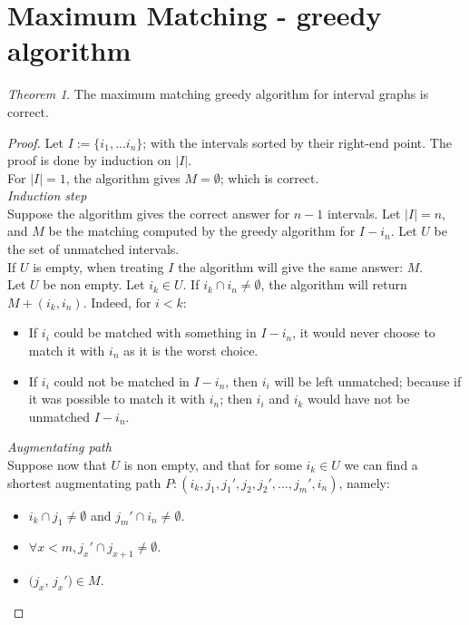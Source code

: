 \documentclass[12pt]{article}
\begin{document}
\theoremstyle{definition}
\newtheorem{definition}{Definition}[section]

\theoremstyle{remark}
\newtheorem*{remark}{Remark}
\newtheorem{theorem}{Theorem}[section]
\newtheorem{lemma}[theorem]{Lemma}

\section{Maximum Matching - greedy algorithm}

\begin{theorem}
    The maximum matching greedy algorithm for interval graphs is correct.
\end{theorem}

\begin{proof}
    Let $I:= \{i_1, ... i_n\}$; with the intervals sorted by their right-end point.
    The proof is done by induction on $|I|$.\\
    For $|I|=1$, the algorithm gives $M=\emptyset$; which is correct. \\

    \textit{Induction step}\\
    Suppose the algorithm gives the correct answer for $n-1$ intervals. Let $|I| = n$, and $M$ be the matching computed by the greedy algorithm for $I-i_n$. Let $U$ be the set of unmatched intervals. \\
    If $U$ is empty, when treating $I$ the algorithm will give the same answer: $M$.\\
    Let $U$ be non empty. Let $i_k \in U$. If $i_k \cap i_n \ne \emptyset$, the algorithm will return $M+(i_k, i_n)$. 
    Indeed, for $i<k$:
    \begin{itemize}
        \item If $i_i$ could be matched with something in $I-i_n$, it would never choose to match it with $i_n$ as it is the worst choice. 
        \item If $i_i$ could not be matched in $I-i_n$, then $i_i$ will be left unmatched; because if it was possible to match it with $i_n$; then $i_i$ and $i_k$ would have not be unmatched $I-i_n$. 
    \end{itemize} 

    \textit{Augmentating path}\\
    Suppose now that $U$ is non empty, and that for some $i_k \in U$ we can find a shortest augmentating path $P: (i_k, j_1, j_1', j_2, j_2', ... , j_m', i_n)$, namely:
    \begin{itemize}
        \item $i_k \cap j_1 \ne \emptyset$ and $j_m'\cap i_n \ne \emptyset$.
        \item $\forall x<m, j_x' \cap j_{x+1} \ne \emptyset$.
        \item $(j_x$, $j_x') \in M$.
        

\end{itemize}
\end{proof}
\end{document}
